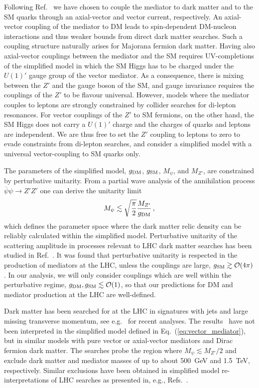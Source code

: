 \documentclass[floatfix]{article}
\begin{document}
Following Ref.~\cite{Kahlhoefer:2015bea} we have chosen to couple the mediator to 
dark matter and to the SM quarks through an axial-vector and vector current, respectively. An axial-vector coupling of the 
mediator to DM leads to spin-dependent DM-nucleon interactions and thus weaker bounds from direct dark matter searches. 
Such a coupling structure naturally arises for Majorana fermion dark matter. Having also axial-vector couplings between
the mediator and the SM  requires UV-completions of the simplified model in which the SM Higgs has to be charged under 
the $U(1)'$ gauge group of the vector mediator. As a consequence, there is mixing between the $Z'$ and the gauge boson of the SM, and gauge invariance 
requires the couplings of the $Z'$ to be flavour universal. However, models where the mediator couples to leptons 
are strongly constrained by collider searches for di-lepton resonances. For vector couplings of the $Z'$ to  SM fermions, on the other hand, 
the SM Higgs does not carry a $U(1)'$ charge and the charges of quarks and leptons are independent. We are thus free to set the 
$Z'$ coupling to leptons to zero to evade constraints from di-lepton searches, and consider a simplified model with a universal vector-coupling 
to SM quarks only. 

The parameters of the simplified model, $g_{\rm DM}$, $g_{\rm SM}$, $M_\psi$, and $M_{Z'}$, are constrained by perturbative unitarity. 
From a partial wave analysis of the annihilation process $\overline{\psi}\psi \to Z' Z'$ one can derive the unitarity limit~\cite{Kahlhoefer:2015bea}
\begin{equation}
M_\psi \lesssim \sqrt{\frac{\pi}{2}} \frac{M_{Z'}}{g_{\rm DM}}\,,
\end{equation}
which defines the parameter space where the dark matter relic density can be reliably calculated within the simplified model. 
Perturbative unitarity of the scattering amplitude in processes relevant to LHC dark matter searches has been studied in Ref.~\cite{Englert:2016joy}. 
It was found that perturbative unitarity is respected in the production of mediators at the LHC, unless 
the couplings are large, $g_{\rm SM} \gtrsim {\cal O}(4\pi)$. In our analysis, we will only consider couplings which are well within the 
perturbative regime, $g_{\rm DM}, g_{\rm SM} \lesssim {\cal O}(1)$, so that our predictions for DM and mediator production at the LHC 
are well-defined. 

Dark matter has been searched for at the LHC in signatures with jets and large missing transverse momentum, see e.g.~\cite{Aaboud:2016tnv,CMS:2016tns} for recent analyses. 
The results~\cite{Aaboud:2016tnv,CMS:2016tns}  have not been interpreted in the simplified model defined in Eq.~(\ref{eq:vector_mediator}), but in similar models with pure vector or axial-vector mediators and Dirac fermion dark matter. The  searches probe the region where $M_{\psi} \lesssim M_{Z'}/2$ and exclude dark matter and mediator masses of up to about 500~GeV and 1.5~TeV, respectively. Similar exclusions have been obtained in simplified model re-interpretations of LHC searches as presented in, e.g.,  Refs.~\cite{Kahlhoefer:2015bea, Heisig:2015ira}. 
\end{document}
